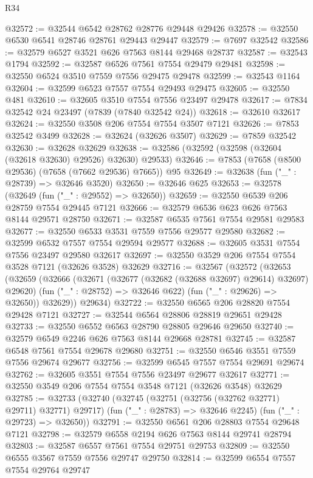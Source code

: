 \begin{lexlean}{R34}
\begin{coremodule}
@32572 := @32544 @6542 @28762 @28776 @29448 @29426
@32578 := @32550 @6530 @6541 @28746 @28761 @29443 @29447
@32579 := @7697 @32542
@32586 := @32579 @6527 @3521 @626 @7563 @8144 @29468 @28737
@32587 := @32543 @1794
@32592 := @32587 @6526 @7561 @7554 @29479 @29481
@32598 := @32550 @6524 @3510 @7559 @7556 @29475 @29478
@32599 := @32543 @1164
@32604 := @32599 @6523 @7557 @7554 @29493 @29475
@32605 := @32550 @481
@32610 := @32605 @3510 @7554 @7556 @23497 @29478
@32617 := @7834 @32542 @24 @23497 (@7839 (@7840 @32542 @24))
@32618 := @32610 @32617
@32624 := @32550 @3508 @206 @7554 @7554 @3507 @7121
@32626 := @7853 @32542 @3499
@32628 := @32624 (@32626 @3507)
@32629 := @7859 @32542
@32630 := @32628 @32629
@32638 := @32586 (@32592 (@32598 (@32604 (@32618 @32630) @29526) @32630) @29533)
@32646 := @7853 (@7658 (@8500 @29536) (@7658 (@7662 @29536) @7665)) @95
@32649 := @32638 (fun ("_" : @28739) => @32646 @3520)
@32650 := @32646 @625
@32653 := @32578 (@32649 (fun ("_" : @29552) => @32650))
@32659 := @32550 @6539 @206 @28759 @7554 @29445 @7121
@32666 := @32579 @6536 @623 @626 @7563 @8144 @29571 @28750
@32671 := @32587 @6535 @7561 @7554 @29581 @29583
@32677 := @32550 @6533 @3531 @7559 @7556 @29577 @29580
@32682 := @32599 @6532 @7557 @7554 @29594 @29577
@32688 := @32605 @3531 @7554 @7556 @23497 @29580 @32617
@32697 := @32550 @3529 @206 @7554 @7554 @3528 @7121 (@32626 @3528) @32629
@32716 := @32567
    (@32572
      (@32653
        (@32659
          (@32666
            (@32671 (@32677 (@32682 (@32688 @32697) @29614) @32697) @29620)
            (fun ("_" : @28752) => @32646 @622)
            (fun ("_" : @29626) => @32650))
          @32629))
      @29634)
@32722 := @32550 @6565 @206 @28820 @7554 @29428 @7121
@32727 := @32544 @6564 @28806 @28819 @29651 @29428
@32733 := @32550 @6552 @6563 @28790 @28805 @29646 @29650
@32740 := @32579 @6549 @2246 @626 @7563 @8144 @29668 @28781
@32745 := @32587 @6548 @7561 @7554 @29678 @29680
@32751 := @32550 @6546 @3551 @7559 @7556 @29674 @29677
@32756 := @32599 @6545 @7557 @7554 @29691 @29674
@32762 := @32605 @3551 @7554 @7556 @23497 @29677 @32617
@32771 := @32550 @3549 @206 @7554 @7554 @3548 @7121 (@32626 @3548) @32629
@32785 := @32733
    (@32740
      (@32745 (@32751 (@32756 (@32762 @32771) @29711) @32771) @29717)
      (fun ("_" : @28783) => @32646 @2245)
      (fun ("_" : @29723) => @32650))
@32791 := @32550 @6561 @206 @28803 @7554 @29648 @7121
@32798 := @32579 @6558 @2194 @626 @7563 @8144 @29741 @28794
@32803 := @32587 @6557 @7561 @7554 @29751 @29753
@32809 := @32550 @6555 @3567 @7559 @7556 @29747 @29750
@32814 := @32599 @6554 @7557 @7554 @29764 @29747

\end{coremodule}
\end{lexlean}
